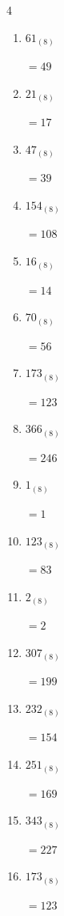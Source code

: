 \begin{multicols}{4}
\begin{enumerate}
  \item $61_{(8)}$

        $=49$

  \item $21_{(8)}$

        $=17$

  \item $47_{(8)}$

        $=39$

  \item $154_{(8)}$

        $=108$

  \item $16_{(8)}$

        $=14$

  \item $70_{(8)}$

        $=56$

  \item $173_{(8)}$

        $=123$

  \item $366_{(8)}$

        $=246$

  \item $1_{(8)}$

        $=1$

  \item $123_{(8)}$

        $=83$

  \item $2_{(8)}$

        $=2$

  \item $307_{(8)}$

        $=199$

  \item $232_{(8)}$

        $=154$

\columnbreak %

\resetques

  \item $251_{(8)}$

        $=169$

  \item $343_{(8)}$

        $=227$

  \item $173_{(8)}$

        $=123$


\end{enumerate}
\end{multicols}
